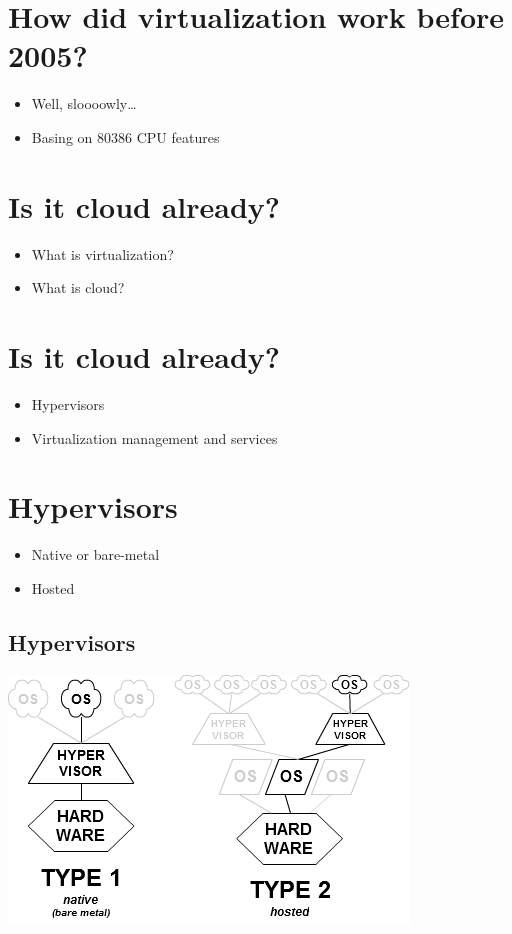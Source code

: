 \documentclass[11pt]{article}
\begin{document}
\section*{How did virtualization work before 2005?}
\label{sec:org0beab64}
\begin{itemize}
\item Well, sloooowly\ldots{}
\item Basing on 80386 CPU features
\end{itemize}

\section*{Is it cloud already?}
\label{sec:org116f487}
\begin{itemize}
\item What is virtualization?
\item What is cloud?
\end{itemize}

\section*{Is it cloud already?}
\label{sec:org6eaf2c1}
\begin{itemize}
\item Hypervisors
\item Virtualization management and services
\end{itemize}

\section*{Hypervisors}
\label{sec:org17a5f62}
\begin{itemize}
\item Native or bare-metal
\item Hosted
\end{itemize}

\subsection*{Hypervisors}
\label{sec:org6b70c04}
\begin{center}
\includegraphics[width=.9\linewidth]{./hyperviseur.png}
\end{center}
\end{document}
